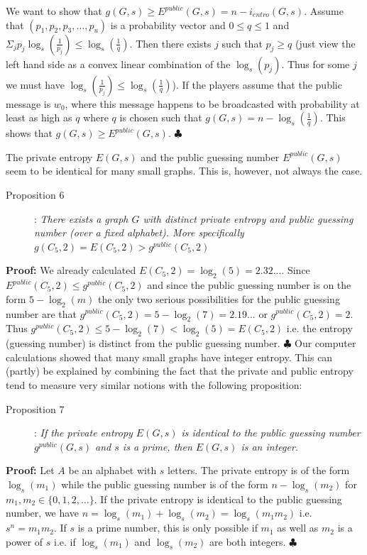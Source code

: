 \documentclass[12pt]{article}
\begin{document}
We want to show that $g(G,s) \geq E^{public}(G,s)=n-i_{entro}(G,s)$.  Assume that $(p_1,p_2, p_3, \ldots,p_u)$ is a probability vector and $0 \leq q \leq 1$ and  $\Sigma_j p_j \log_s(\frac{1}{p_j}) \leq \log_s(\frac{1}{q})$. Then
there exists $j$ such that $p_j \geq q$ (just view the left hand side as a convex linear combination
of the $\log_s(p_j)$.  Thus for some $j$ we must have $\log_s(\frac{1}{p_j}) \leq \log_s(\frac{1}{q})$).
If the players assume that the public message is $w_0$, where this message happens to be broadcasted with probability at least as high as $q$ where $q$ is chosen such that $g(G,s)=n-\log_s(\frac{1}{q})$. This shows that $g(G,s) \geq E^{public}(G,s)$.
  \hfill $\clubsuit$


The private entropy $E(G,s)$ and the public guessing number \newline 
$E^{public}(G,s)$ seem to be identical for many small graphs.  This is, however, not always the case.   

\begin{description}

\item[Proposition 6]: 
{\it There exists a graph $G$ with distinct private entropy and public guessing number 
(over a fixed alphabet). More specifically \newline $g(C_5,2)=E(C_5,2)>g^{public}(C_5,2)$}
\end{description}
{\bf Proof:}  We already calculated $E(C_5,2)=\log_2(5)=2.32...$.  
Since \newline $E^{public}(C_5,2) \leq g^{public}(C_5,2)$ and since the public guessing 
number is on the form $5-\log_2(m)$ the only two serious possibilities
for the public guessing number are that 
$g^{public}(C_5,2)=5-\log_2(7)=2.19...  $ or $g^{public}(C_5,2)=2$.  
Thus $g^{public}(C_5,2) \leq 5-\log_2(7) < \log_2(5)=E(C_5,2)$ i.e. the entropy (guessing number) 
is distinct from the public guessing number. \hfill $\clubsuit$ \newline
Our computer calculations showed that many small graphs have integer 
entropy. This can (partly) be explained by combining the fact that the 
private and public entropy tend to measure very similar notions with the 
following proposition:  

\begin{description}

\item[Proposition 7]: 
{\it If the private entropy $E(G,s)$ is identical to the public guessing number 
$g^{public}(G,s)$ and $s$ is a prime, then $E(G,s)$ is an integer.} 

\end{description}
{\bf Proof:} Let $A$ be an alphabet with $s$ letters. 
The private entropy is of the form $\log_s(m_1)$ while the public guessing number 
is of the form $n-\log_s(m_2)$ for $m_1,m_2 \in \{0,1,2, \ldots\}$. If the 
private entropy is identical to the public guessing number,
we have $n=\log_s(m_1)+\log_s(m_2)=\log_s(m_1 m_2)$ i.e. $s^n=m_1 m_2$. If 
$s$ is a prime number, this is only possible if $m_1$ as well as $m_2$ is a 
power of $s$ i.e. if $\log_s(m_1)$ and $\log_s(m_2)$ are both integers.  
\hfill $\clubsuit$
\end{document}
